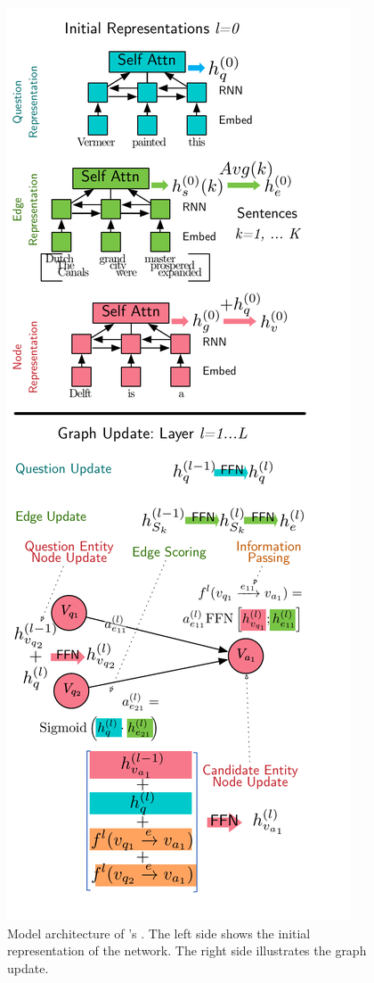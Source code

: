 
\begin{figure}[h!]

  
    \begin{center}
    \includegraphics[width=0.86\linewidth]{2020_www_delft/figures/model}
    \end{center}
    \caption{Model architecture of \name{}'s . The left side
      shows the initial representation of the network. The right side
      illustrates the graph update.  }
    \label{fig:model}
\end{figure}

